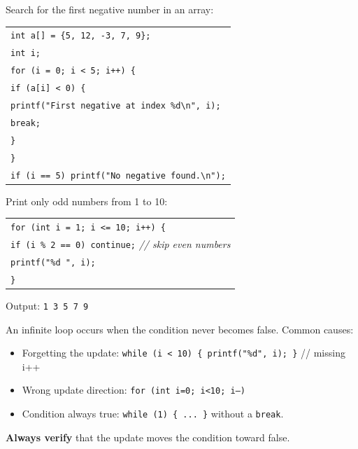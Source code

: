 \documentclass[11pt]{article}
\begin{document}
\begin{exemplebox}
Search for the first negative number in an array:
\begin{center}
\begin{tabular}{l}
\texttt{int a[] = \{5, 12, -3, 7, 9\};} \\
\texttt{int i;} \\
\texttt{for (i = 0; i < 5; i++) \{} \\
\qquad \texttt{if (a[i] < 0) \{} \\
\qquad\qquad \texttt{printf("First negative at index \%d\textbackslash n", i);} \\
\qquad\qquad \texttt{break;} \\
\qquad \texttt{\}} \\
\texttt{\}} \\
\texttt{if (i == 5) printf("No negative found.\textbackslash n");}
\end{tabular}
\end{center}
\end{exemplebox}

\begin{exemplebox}
Print only odd numbers from 1 to 10:
\begin{center}
\begin{tabular}{l}
\texttt{for (int i = 1; i <= 10; i++) \{} \\
\qquad \texttt{if (i \% 2 == 0) continue;} \quad \textit{// skip even numbers} \\
\qquad \texttt{printf("\%d ", i);} \\
\texttt{\}}
\end{tabular}
\end{center}
Output: \texttt{1 3 5 7 9}
\end{exemplebox}

\begin{attention}
An infinite loop occurs when the condition never becomes false. Common causes:
\begin{itemize}
  \item Forgetting the update: \texttt{while (i < 10) \{ printf("\%d", i); \}} // missing i++
  \item Wrong update direction: \texttt{for (int i=0; i<10; i--)}
  \item Condition always true: \texttt{while (1) \{ ... \}} without a \texttt{break}.
\end{itemize}
\textbf{Always verify} that the update moves the condition toward false.
\end{attention}
\end{document}
